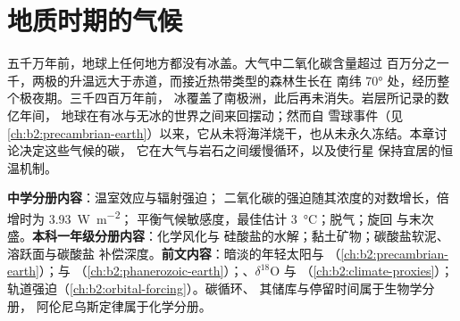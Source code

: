\chapter{地质时期的气候}\label{ch:b2:deep-time-climate}

五千万年前，地球上任何地方都没有冰盖。大气中二氧化碳含量超过
百万分之一千，两极的升温远大于赤道，而接近热带类型的森林生长在
南纬 \ang{70} 处，经历整个极夜期。三千四百万年前，
冰覆盖了南极洲，此后再未消失。岩层所记录的数亿年间，
地球在有冰与无冰的世界之间来回摆动；然而自
雪球事件（见
\cref{ch:b2:precambrian-earth}）以来，它从未将海洋烧干，也从未永久冻结。本章讨论决定这些气候的碳，
它在大气与岩石之间缓慢循环，以及使行星
保持宜居的恒温机制。

\begin{recall}
\textbf{中学分册内容}：温室效应与辐射强迫；
二氧化碳的强迫随其浓度的对数增长，倍增时为 \qty{3.93}{W.m^{-2}}；
平衡气候敏感度，最佳估计 \qty{3}{\celsius}；脱气；旋回
与末次盛。\textbf{本科一年级分册内容}：化学风化与
硅酸盐的水解；黏土矿物；碳酸盐软泥、溶跃面与碳酸盐
补偿深度。\textbf{前文内容}：暗淡的年轻太阳与
（\cref{ch:b2:precambrian-earth}）；与
（\cref{ch:b2:phanerozoic-earth}）；、$\delta^{18}$O 与
（\cref{ch:b2:climate-proxies}）；轨道强迫（\cref{ch:b2:orbital-forcing}）。碳循环、
其储库与停留时间属于生物学分册，
阿伦尼乌斯定律属于化学分册。
\end{recall}

